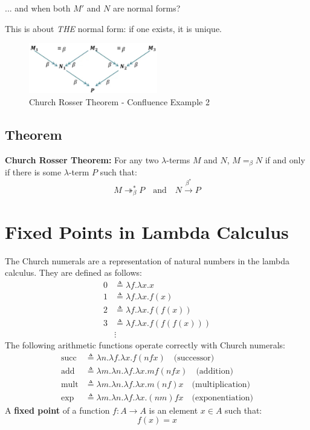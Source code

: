 \documentclass{article}
\begin{document}
    ... and when both $M'$ and $N$ are normal forms?
    
This is about \emph{THE} normal form: if one exists, it is unique.

\begin{figure}[ht]
    \centering
    \includegraphics[width=0.5\textwidth]{img/CR_theorem_diagram_1.jpg} %
    \caption{Church Rosser Theorem - Confluence Example 2}
    \label{fig:cr-diagram-2}
\end{figure}

\subsection*{Theorem}
\textbf{Church Rosser Theorem:} For any two $\lambda$-terms $M$ and $N$, $M =_\beta N$ if and only if there is some $\lambda$-term $P$ such that:
\[
M \twoheadrightarrow_\beta^* P \quad \text{and} \quad N \xrightarrow{\beta^*} P
\]

\section*{Fixed Points in Lambda Calculus}

The Church numerals are a representation of natural numbers in the lambda calculus. They are defined as follows:
\[
\begin{aligned}
    0 &\triangleq \lambda f.\lambda x.x \\
    1 &\triangleq \lambda f.\lambda x.f(x) \\
    2 &\triangleq \lambda f.\lambda x.f(f(x)) \\
    3 &\triangleq \lambda f.\lambda x.f(f(f(x))) \\
    &\vdots
\end{aligned}
\]
The following arithmetic functions operate correctly with Church numerals:
\[
\begin{aligned}
    \text{succ} &\triangleq \lambda n.\lambda f.\lambda x.f(nfx) \quad \text{(successor)} \\
    \text{add} &\triangleq \lambda m.\lambda n.\lambda f.\lambda x.mf(nfx) \quad \text{(addition)} \\
    \text{mult} &\triangleq \lambda m.\lambda n.\lambda f.\lambda x.m(nf)x \quad \text{(multiplication)} \\
    \text{exp} &\triangleq \lambda m.\lambda n.\lambda f.\lambda x.(nm)fx \quad \text{(exponentiation)}
\end{aligned}
\]
A \textbf{fixed point} of a function $f: A \to A$ is an element $x \in A$ such that:
\[
f(x) = x
\]
\end{document}
